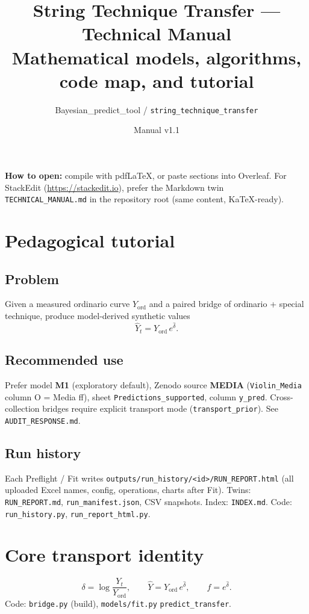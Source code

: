 \documentclass[11pt,a4paper]{article}
\title{String Technique Transfer --- Technical Manual\\
\large Mathematical models, algorithms, code map, and tutorial}
\author{Bayesian\_predict\_tool / \texttt{string\_technique\_transfer}}
\date{Manual v1.1}
\begin{document}
\maketitle
\tableofcontents
\newpage

\noindent\textbf{How to open:} compile with pdfLaTeX, or paste sections into Overleaf.
For StackEdit (\url{https://stackedit.io}), prefer the Markdown twin
\texttt{TECHNICAL\_MANUAL.md} in the repository root (same content, KaTeX-ready).

\section{Pedagogical tutorial}
\subsection{Problem}
Given a measured ordinario curve $Y_{\mathrm{ord}}$ and a paired bridge of
ordinario + special technique, produce model-derived synthetic values
\[
\widehat Y_t = Y_{\mathrm{ord}}\,e^{\widehat\delta}.
\]
\subsection{Recommended use}
Prefer model \textbf{M1} (exploratory default), Zenodo source \textbf{MEDIA}
(\texttt{Violin\_Media} column O = Media ff), sheet
\texttt{Predictions\_supported}, column \texttt{y\_pred}.
Cross-collection bridges require explicit transport mode
(\texttt{transport\_prior}). See \texttt{AUDIT\_RESPONSE.md}.

\subsection{Run history}
Each Preflight / Fit writes
\texttt{outputs/run\_history/<id>/RUN\_REPORT.html}
(all uploaded Excel names, config, operations, charts after Fit).
Twins: \texttt{RUN\_REPORT.md}, \texttt{run\_manifest.json}, CSV snapshots.
Index: \texttt{INDEX.md}. Code: \texttt{run\_history.py}, \texttt{run\_report\_html.py}.

\section{Core transport identity}
\[
\delta=\log\frac{Y_t}{Y_{\mathrm{ord}}},\qquad
\widehat Y = Y_{\mathrm{ord}}\,e^{\widehat\delta},\qquad
f=e^{\widehat\delta}.
\]
Code: \texttt{bridge.py} (build), \texttt{models/fit.py} \texttt{predict\_transfer}.
\end{document}
